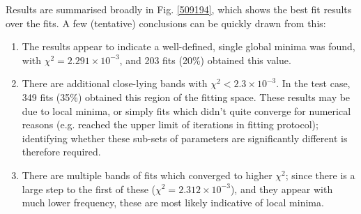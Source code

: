 Results are summarised broadly in Fig. \ref{509194}, which shows the best fit results over the fits. A few (tentative) conclusions can be quickly drawn from this:

\begin{enumerate}
\item The results appear to indicate a well-defined, single global minima was found, with $\chi^2 = 2.291\times10^{-3}$, and 203 fits (20\%) obtained this value.
\item There are additional close-lying bands with $\chi^2 < 2.3\times10^{-3}$. In the test case, 349 fits (35\%) obtained this region of the fitting space. These results may be due to local minima, or simply fits which didn't quite converge for numerical reasons (e.g. reached the upper limit of iterations in fitting protocol); identifying whether these sub-sets of parameters are significantly different is therefore required.
\item There are multiple bands of fits which converged to higher $\chi^2$; since there is a large step to the first of these ($\chi^2 = 2.312\times10^{-3}$), and they appear with much lower frequency, these are most likely indicative of local minima.

\end{enumerate}


